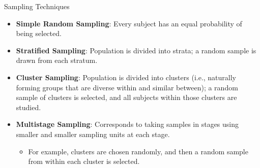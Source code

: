 \documentclass[handout]{beamer} %
\begin{document}
\begin{frame}{Sampling Techniques}
    \begin{itemize}
        \item \textbf{Simple Random Sampling}: Every subject has an equal probability of being selected. \pause %
        \item \textbf{Stratified Sampling}: Population is divided into strata; a random sample is drawn from each stratum. \pause %
        \item \textbf{Cluster Sampling}: Population is divided into clusters (i.e., naturally forming groups that are diverse within and similar between); a random sample of clusters is selected, and all subjects within those clusters are studied. \pause %
        \item \textbf{Multistage Sampling}: Corresponds to taking samples in stages using smaller and smaller sampling units at each stage.
        \begin{itemize}
            \item For example, clusters are chosen randomly, and then a random sample from within each cluster is selected.
        \end{itemize}
    \end{itemize}
\end{frame}
\end{document}
